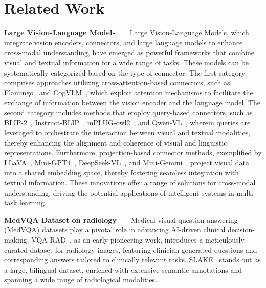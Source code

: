 \section{Related Work}
\noindent \textbf{Large Vision-Language Models} ~ ~ Large Vision-Language Models, which integrate vision encoders, connectors, and large language models to enhance cross-modal understanding, have emerged as powerful frameworks that combine visual and textual information for a wide range of tasks. These models can be systematically categorized based on the type of connector. The first category comprises approaches utilizing cross-attention-based connectors, such as Flamingo~\cite{alayrac2022flamingo} and CogVLM~\cite{wang2023cogvlm,hong2024cogvlm2}, which exploit attention mechanisms to facilitate the exchange of information between the vision encoder and the language model. The second category includes methods that employ query-based connectors, such as BLIP-2~\cite{li2023blip}, Instruct-BLIP~\cite{dai2023instructblip}, mPLUG-owl2~\cite{ye2024mplug}, and Qwen-VL~\cite{bai2023qwen}, wherein queries are leveraged to orchestrate the interaction between visual and textual modalities, thereby enhancing the alignment and coherence of visual and linguistic representations. Furthermore, projection-based connector methods, exemplified by LLaVA~\cite{liu2023llava}, Mini-GPT4~\cite{zhu2023minigpt}, DeepSeek-VL~\cite{lu2024deepseek}, and Mini-Gemini~\cite{li2024mini}, project visual data into a shared embedding space, thereby fostering seamless integration with textual information.
These innovations offer a range of solutions for cross-modal understanding, driving the potential applications of intelligent systems in multi-task learning.



\noindent \textbf{MedVQA Dataset on radiology} ~ ~ Medical visual question answering (MedVQA) datasets play a pivotal role in advancing AI-driven clinical decision-making. VQA-RAD~\cite{Lau2018}, as an early pioneering work, introduces a meticulously curated dataset for radiology images, featuring clinician-generated questions and corresponding answers tailored to clinically relevant tasks. SLAKE~\cite{liu2021slake} stands out as a large, bilingual dataset, enriched with extensive semantic annotations and spanning a wide range of radiological modalities. 

